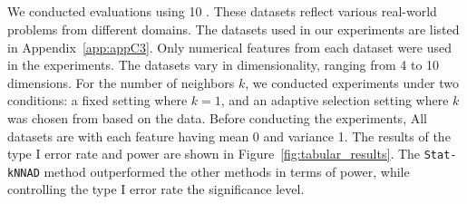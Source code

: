 \subsection{}
\label{subsec:experiment_of_tabular_data}
%
We conducted evaluations using 10 . These datasets reflect various real-world problems from different domains. The datasets used in our experiments are listed in Appendix~\ref{app:appC3}.
%
Only numerical features from each dataset were used in the experiments. 
%
{The datasets vary in dimensionality, ranging from 4 to 10 dimensions.}
%
For the number of neighbors $k$, we conducted experiments under two conditions: a fixed setting where $k=1$, and an adaptive selection setting where $k$ was chosen from  based on the data.
%
Before conducting the experiments, All datasets are  with each feature having mean 0 and variance 1.
%
The results of the type I error rate and power are shown in Figure~\ref{fig:tabular_results}. 
%
The \texttt{Stat-kNNAD} method outperformed the other methods in terms of power, while controlling the type I error rate  the significance level.
%





